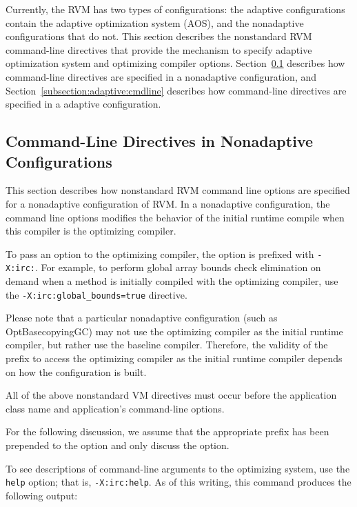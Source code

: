 
Currently, the RVM has two types of configurations:
the adaptive configurations contain the adaptive optimization system (AOS),
and the nonadaptive configurations that do not.  
This section describes the nonstandard RVM command-line directives that 
provide the mechanism to specify adaptive optimization system and optimizing
compiler options.
Section~\ref{subsection:nonadaptive:cmdline} describes how command-line 
directives are specified in a nonadaptive configuration, and 
Section~\ref{subsection:adaptive:cmdline} describes how command-line 
directives are specified in a adaptive configuration.

\subsection{Command-Line Directives in Nonadaptive Configurations}
\label{subsection:nonadaptive:cmdline}

This section describes how nonstandard RVM command line options are 
specified for a nonadaptive configuration of RVM.
In a nonadaptive configuration, the command line options modifies
the behavior of the initial runtime compile when this compiler
is the optimizing compiler.

To pass an option to the optimizing compiler, the option is prefixed
with {\tt -X:irc:}.
For example, to perform global array bounds check elimination on demand
when a method is initially compiled with the optimizing compiler,
use the {\tt -X:irc:global\_bounds=true} directive.

Please note that a particular nonadaptive configuration (such as
OptBasecopyingGC) may not use the 
optimizing compiler as the initial runtime compiler, but rather use the 
baseline compiler.
Therefore, the validity of the prefix to access the optimizing compiler
as the initial runtime compiler depends on how the configuration is built.

All of the above nonstandard VM directives must occur before 
the application class name and application's command-line options.

For the following discussion, we assume that the appropriate prefix has been
prepended to the option and only discuss the option.

To see descriptions of command-line arguments to the optimizing system, use
the {\tt help} option; that is, {\tt -X:irc:help}.  
As of this writing, this command produces the following output:



